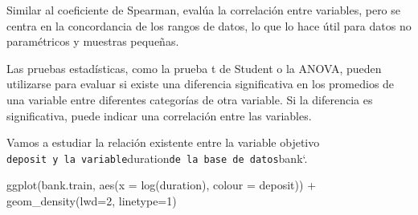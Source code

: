\documentclass[
  letterpaper,
  DIV=11,
  numbers=noendperiod]{scrreprt}
\newenvironment{Shaded}{\begin{snugshade}}{\end{snugshade}}
\newcommand{\AttributeTok}[1]{\textcolor[rgb]{0.40,0.45,0.13}{#1}}
\newcommand{\DecValTok}[1]{\textcolor[rgb]{0.68,0.00,0.00}{#1}}
\newcommand{\FunctionTok}[1]{\textcolor[rgb]{0.28,0.35,0.67}{#1}}
\newcommand{\NormalTok}[1]{\textcolor[rgb]{0.00,0.23,0.31}{#1}}
\newcommand{\SpecialCharTok}[1]{\textcolor[rgb]{0.37,0.37,0.37}{#1}}
\begin{document}
\begin{tcolorbox}[enhanced jigsaw, arc=.35mm, breakable, coltitle=black, left=2mm, opacityback=0, bottomtitle=1mm, colbacktitle=quarto-callout-note-color!10!white, title=\textcolor{quarto-callout-note-color}{\faInfo}\hspace{0.5em}{Coeficiente de Correlación de Kendall}, titlerule=0mm, colback=white, colframe=quarto-callout-note-color-frame, bottomrule=.15mm, rightrule=.15mm, opacitybacktitle=0.6, toptitle=1mm, toprule=.15mm, leftrule=.75mm]

Similar al coeficiente de Spearman, evalúa la correlación entre
variables, pero se centra en la concordancia de los rangos de datos, lo
que lo hace útil para datos no paramétricos y muestras pequeñas.

\end{tcolorbox}

\begin{tcolorbox}[enhanced jigsaw, arc=.35mm, breakable, coltitle=black, left=2mm, opacityback=0, bottomtitle=1mm, colbacktitle=quarto-callout-note-color!10!white, title=\textcolor{quarto-callout-note-color}{\faInfo}\hspace{0.5em}{Coeficiente de Correlación de Kendall}, titlerule=0mm, colback=white, colframe=quarto-callout-note-color-frame, bottomrule=.15mm, rightrule=.15mm, opacitybacktitle=0.6, toptitle=1mm, toprule=.15mm, leftrule=.75mm]

Las pruebas estadísticas, como la prueba t de Student o la ANOVA, pueden
utilizarse para evaluar si existe una diferencia significativa en los
promedios de una variable entre diferentes categorías de otra variable.
Si la diferencia es significativa, puede indicar una correlación entre
las variables.

\end{tcolorbox}

Vamos a estudiar la relación existente entre la variable objetivo
\texttt{deposit\textquotesingle{}\ y\ la\ variable}duration\texttt{de\ la\ base\ de\ datos}bank`.

\begin{Shaded}
\begin{Highlighting}[]
\FunctionTok{ggplot}\NormalTok{(bank.train, }\FunctionTok{aes}\NormalTok{(}\AttributeTok{x =} \FunctionTok{log}\NormalTok{(duration), }\AttributeTok{colour =}\NormalTok{ deposit)) }\SpecialCharTok{+}
  \FunctionTok{geom\_density}\NormalTok{(}\AttributeTok{lwd=}\DecValTok{2}\NormalTok{, }\AttributeTok{linetype=}\DecValTok{1}\NormalTok{)}
\end{Highlighting}
\end{Shaded}
\end{document}
